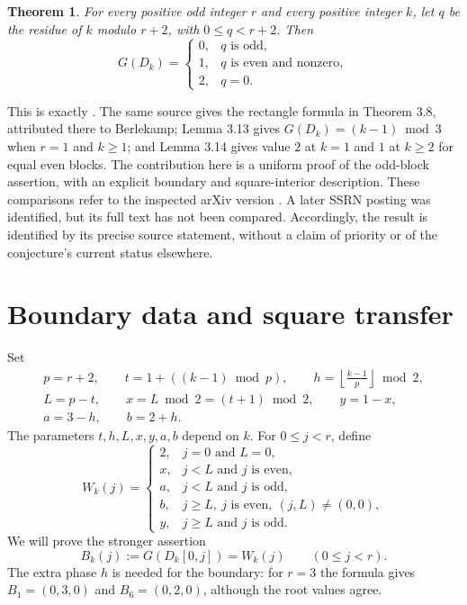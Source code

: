 \documentclass[11pt]{article}
\newtheorem{theorem}{Theorem}
\theoremstyle{remark}
\begin{document}
\begin{theorem}\label{thm:main}
For every positive odd integer $r$ and every positive integer $k$, let
$q$ be the residue of $k$ modulo $r+2$, with $0\leq q<r+2$. Then
\begin{equation}\label{eq:main}
 G(D_k)=
 \begin{cases}
 0,&q\text{ is odd},\\
 1,&q\text{ is even and nonzero},\\
 2,&q=0.
 \end{cases}
\end{equation}
\end{theorem}

This is exactly \cite[Conjecture 5.1]{gkm2025}. The same source gives
the rectangle formula in Theorem 3.8, attributed there to Berlekamp;
Lemma 3.13 gives $G(D_k)=(k-1)\bmod3$ when $r=1$ and $k\geq1$;
and Lemma 3.14 gives value $2$ at $k=1$ and $1$ at $k\geq2$ for
equal even blocks. The contribution here is a uniform proof of the
odd-block assertion, with an explicit boundary and square-interior
description. These comparisons refer to the inspected arXiv version
\cite{gkm2025}. A later SSRN posting \cite{gkmssrn2025} was identified,
but its full text has not been compared. Accordingly, the result is
identified by its precise source statement, without a claim of priority
or of the conjecture's current status elsewhere.

\section{Boundary data and square transfer}

Set
\begin{equation}\label{eq:parameters}
\begin{gathered}
 p=r+2,\qquad t=1+((k-1)\bmod p),\qquad
 h=\left\lfloor\frac{k-1}{p}\right\rfloor\bmod2,\\
 L=p-t,\qquad x=L\bmod2=(t+1)\bmod2,\qquad y=1-x,\\
 a=3-h,\qquad b=2+h.
\end{gathered}
\end{equation}
The parameters $t,h,L,x,y,a,b$ depend on $k$. For $0\leq j<r$, define
\begin{equation}\label{eq:word}
 W_k(j)=
 \begin{cases}
 2,&j=0\text{ and }L=0,\\
 x,&j<L\text{ and }j\text{ is even},\\
 a,&j<L\text{ and }j\text{ is odd},\\
 b,&j\geq L,\ j\text{ is even},\ (j,L)\ne(0,0),\\
 y,&j\geq L\text{ and }j\text{ is odd}.
 \end{cases}
\end{equation}
We will prove the stronger assertion
\begin{equation}\label{eq:boundary}
 B_k(j):=G(D_k[0,j])=W_k(j)\qquad(0\leq j<r).
\end{equation}
The extra phase $h$ is needed for the boundary: for $r=3$ the formula
gives $B_1=(0,3,0)$ and $B_6=(0,2,0)$, although the root values agree.
\end{document}
